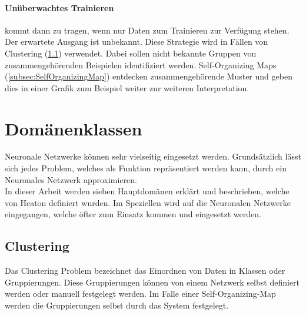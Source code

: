 \paragraph{Unüberwachtes Trainieren} kommt dann zu tragen, wenn nur Daten zum Trainieren zur Verfügung stehen.
Der erwartete Ausgang ist unbekannt.
Diese Strategie wird in Fällen von Clustering (\ref{subsec:Clustering}) verwendet.
Dabei sollen nicht bekannte Gruppen von zusammengehörenden Beispielen identifiziert werden. 
Self-Organizing Maps (\ref{subsec:SelfOrganizingMap}) entdecken zusammengehörende Muster und geben dies in einer Grafik zum Beispiel weiter zur weiteren Interpretation.

\section{Domänenklassen}
\label{sec:Domänenklassen}

Neuronale Netzwerke können sehr vielseitig eingesetzt werden. 
Grundsätzlich lässt sich jedes Problem, welches als Funktion repräsentiert werden kann, durch ein Neuronales Netzwerk approximieren. \\

\noindent
In dieser Arbeit werden sieben Hauptdomänen erklärt und beschrieben, welche von Heaton \cite{AI3} definiert wurden. %
Im Speziellen wird auf die Neuronalen Netzwerke eingegangen, welche öfter zum Einsatz kommen und eingesetzt werden.

\subsection{Clustering}
\label{subsec:Clustering}

Das Clustering Problem bezeichnet das Einordnen von Daten in Klassen oder Gruppierungen. 
Diese Gruppierungen können von einem Netzwerk selbst definiert werden oder manuell festgelegt werden. 
Im Falle einer Self-Organizing-Map werden die Gruppierungen selbst durch das System festgelegt.

